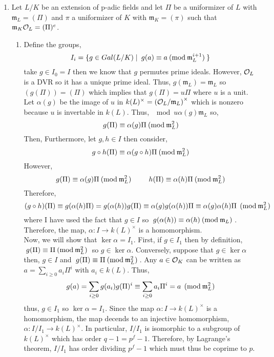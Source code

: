 \documentclass[12pt]{extarticle}
\begin{document}
\begin{enumerate}
\item Let $L / K$ be an extension of p-adic fields and let $\Pi$ be a uniformizer of $L$ with $\mathfrak{m}_L = (\Pi)$ and $\pi$ a uniformizer of $K$ with $\mathfrak{m}_K = (\pi)$ such that $\mathfrak{m}_K \mathcal{O}_{L} = (\Pi)^e $.
\begin{enumerate}
\item 
Define the groups,
\[ I_i = \{ g \in Gal \small(L/K \small) \mid \: g(a) \equiv a \: (\mathrm{mod} \: \mathfrak{m}_L^{i + 1}) \: \} \]
take $g \in I_0 = I$ then we know that $g$ permutes prime ideals. However, $\mathcal{O}_{L}$ is a DVR so it has a unique prime ideal. Thus, $g(\mathfrak{m}_L) = \mathfrak{m}_L$ so $(g(\Pi)) = (\Pi)$ which implies that $g(\Pi) = u \Pi$ where $u$ is a unit. Let $\alpha(g)$ be the image of $u$ in $k(L)^\times = \left(\mathcal{O}_{L}/\mathfrak{m}_L\right)^\times$ which is nonzero because $u$ is invertable in $k(L)$. Thus, $\mod{u}{\alpha(g)}{\mathfrak{m}_L}$ so,
\[\: g(\Pi) \equiv \alpha(g) \Pi \: (\mathrm{mod} \: \mathfrak{m}_{L}^2) \: \]
Then, Furthermore, let $g, h \in I$ then consider,
\[ \: g \circ h(\Pi) \equiv \alpha(g \circ h) \Pi \: (\mathrm{mod} \: \mathfrak{m}_{L}^2) \: \]
However,
\[ \: g(\Pi) \equiv \alpha(g) \Pi \: (\mathrm{mod} \: \mathfrak{m}_{L}^2) \: \quad \quad \: h(\Pi) \equiv \alpha(h) \Pi \: (\mathrm{mod} \: \mathfrak{m}_{L}^2) \:\]
Therefore,
\[ (g \circ h)(\Pi) \equiv g( \alpha(h) \Pi) = g(\alpha(h)) g(\Pi) \equiv \alpha(g) g(\alpha(h)) \Pi \equiv \alpha(g) \alpha(h) \Pi \: \: (\mathrm{mod} \: \mathfrak{m}_{L}^2) \]
where I have used the fact that $g \in I$ so $\: g(\alpha(h)) \equiv \alpha(h) \: (\mathrm{mod} \: \mathfrak{m}_{L}) \:$. Therefore, the map, $\alpha : I \to k(L)^\times$ is a homomorphism. \bigskip \\
Now, we will show that $\ker{\alpha} = I_1$. First, if $g \in I_1$ then by definition, $\: g(\Pi) \equiv \Pi \: (\mathrm{mod} \: \mathfrak{m}_{L}^2) \:$ so $g \in \ker{\alpha}$. Conversely, suppose that $g \in \ker{\alpha}$ then, $g \in I$ and $\: g(\Pi) \equiv \Pi \: (\mathrm{mod} \: \mathfrak{m}_{L}^2) \:$. Any $a \in \mathcal{O}_{K}$ can be written as $a = \sum\limits_{i \ge 0} a_i \Pi^i$ with $a_i \in k(L)$. Thus,
\[ g(a) = \sum\limits_{i \ge 0} g(a_i) g(\Pi)^i \equiv \sum\limits_{i \ge 0} a_i \Pi^i = a \: \: (\mathrm{mod} \: \mathfrak{m}_{L}^2) \]
thus, $g \in I_1$ so $\ker{\alpha} = I_1$. Since the map $\alpha : I \to k(L)^\times$ is a homomorphism, the map decends to an injective homomorphism, $\alpha : I/I_1 \to k(L)^\times$. In particular, $I/I_1$ is isomorphic to a subgroup of $k(L)^\times$ which has order $q - 1 = p^f - 1$. Therefore, by Lagrange's theorem, $I/I_1$ has order dividing $p^f - 1$ which must thus be coprime to $p$.
   

\end{enumerate}
\end{enumerate}
\end{document}
